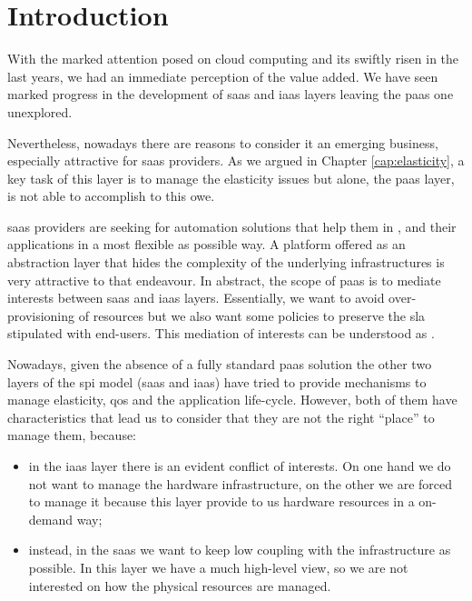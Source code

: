 %
%
\section{Introduction}
\label{sec:architecture-introduction}
With the marked attention posed on cloud computing and its swiftly risen in the last years, we had
an immediate perception of the value added. We have seen marked progress in the development of
\ac{saas} and \ac{iaas} layers leaving the \ac{paas} one unexplored.

Nevertheless, nowadays there are reasons to consider it an emerging business, especially attractive
for \ac{saas} providers. As we argued in Chapter \ref{cap:elasticity}, a key task of this layer is
to manage the elasticity issues but alone, the \ac{paas} layer, is not able to accomplish to this owe.

\ac{saas} providers are seeking for automation solutions that help them in ,
 and  their applications in a most flexible as possible way. A
platform offered as an abstraction layer that hides the complexity of the underlying infrastructures
is very attractive to that endeavour. In abstract, the scope of \ac{paas} is to mediate interests
between \ac{saas} and \ac{iaas} layers. Essentially, we want to avoid over-provisioning of resources
but we also want some policies to preserve the \ac{sla} stipulated with end-users. This mediation
of interests can be understood as .

Nowadays, given the absence of a fully standard \ac{paas} solution the other two layers of the \ac{spi}
model (\ac{saas} and \ac{iaas}) have tried to provide mechanisms to manage elasticity, \ac{qos} and the
application life-cycle. However, both of them have characteristics that lead us to consider that they are
not the right ``place'' to manage them, because:

\begin{itemize}
	\item{in the \ac{iaas} layer there is an evident conflict of interests. On one hand we do not want
		to manage the hardware infrastructure, on the other we are forced to manage it because this layer
		provide to us hardware resources in a on-demand way;}
	\item{instead, in the \ac{saas} we want to keep low coupling with the infrastructure as possible. In
		this layer we have a much high-level view, so we are not interested on how the physical resources
		are managed.}
\end{itemize}

